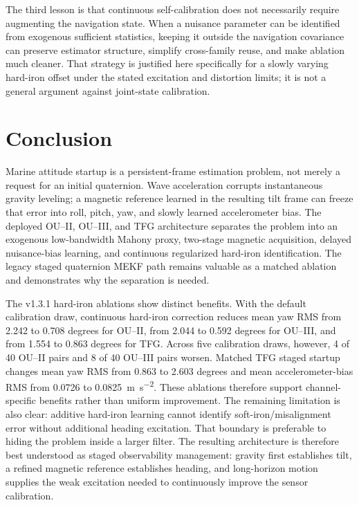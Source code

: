 \documentclass[conference]{IEEEtran}
\begin{document}
The third lesson is that continuous self-calibration does not necessarily require
augmenting the navigation state.  When a nuisance parameter can be identified from
exogenous sufficient statistics, keeping it outside the navigation covariance can
preserve estimator structure, simplify cross-family reuse, and make ablation much
cleaner.  That strategy is justified here specifically for a slowly varying hard-iron
offset under the stated excitation and distortion limits; it is not a general argument
against joint-state calibration.

\section{Conclusion}
\label{sec:conclusion}

Marine attitude startup is a persistent-frame estimation problem, not merely a request
for an initial quaternion.  Wave acceleration corrupts instantaneous gravity leveling;
a magnetic reference learned in the resulting tilt frame can freeze that error into
roll, pitch, yaw, and slowly learned accelerometer bias.  The deployed OU--II,
OU--III, and TFG architecture separates the problem into an exogenous low-bandwidth
Mahony proxy, two-stage magnetic acquisition, delayed nuisance-bias learning, and
continuous regularized hard-iron identification.  The legacy staged quaternion MEKF
path remains valuable as a matched ablation and demonstrates why the separation is
needed.

The v1.3.1 hard-iron ablations show distinct benefits. With the default
calibration draw, continuous hard-iron correction reduces mean yaw RMS from
2.242 to 0.708 degrees for OU--II, from 2.044 to 0.592 degrees for OU--III,
and from 1.554 to 0.863 degrees for TFG. Across five calibration draws,
however, 4 of 40 OU--II pairs and 8 of 40 OU--III pairs worsen. Matched
TFG staged startup changes mean yaw RMS from 0.863 to 2.603 degrees
and mean accelerometer-bias RMS from 0.0726 to 0.0825~\si{m.s^{-2}}.
These ablations therefore support channel-specific benefits rather than uniform improvement. The remaining limitation is also
clear: additive hard-iron learning cannot identify soft-iron/misalignment error without
additional heading excitation.  That boundary is preferable to hiding the problem
inside a larger filter.  The resulting architecture is therefore best understood as
staged observability management: gravity first establishes tilt, a refined magnetic
reference establishes heading, and long-horizon motion supplies the weak excitation
needed to continuously improve the sensor calibration.



\end{document}
